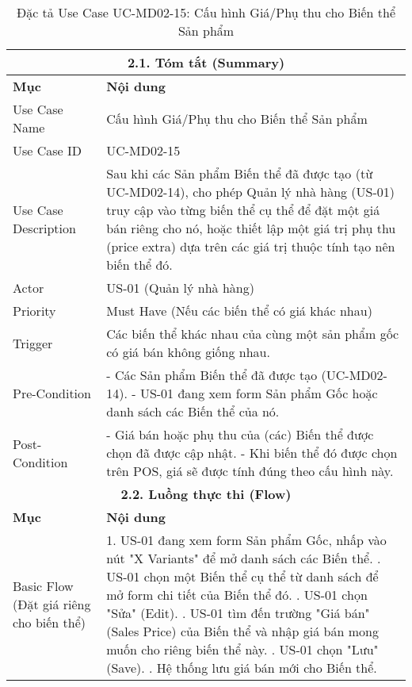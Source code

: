 \begin{longtable}{|m{4cm}|p{11cm}|}
\caption{Đặc tả Use Case UC-MD02-15: Cấu hình Giá/Phụ thu cho Biến thể Sản phẩm} \label{tab:uc_md02_15_revised} \\
\hline
\multicolumn{2}{|c|}{\textbf{2.1. Tóm tắt (Summary)}} \\
\hline
\textbf{Mục} & \textbf{Nội dung} \\
\hline
\endhead %
\hline
\endfoot %
\hline
\endlastfoot %
Use Case Name & Cấu hình Giá/Phụ thu cho Biến thể Sản phẩm \\
\hline
Use Case ID & UC-MD02-15 \\
\hline
Use Case Description & Sau khi các Sản phẩm Biến thể đã được tạo (từ UC-MD02-14), cho phép Quản lý nhà hàng (US-01) truy cập vào từng biến thể cụ thể để đặt một giá bán riêng cho nó, hoặc thiết lập một giá trị phụ thu (price extra) dựa trên các giá trị thuộc tính tạo nên biến thể đó. \\
\hline
Actor & US-01 (Quản lý nhà hàng) \\
\hline
Priority & Must Have (Nếu các biến thể có giá khác nhau) \\
\hline
Trigger & Các biến thể khác nhau của cùng một sản phẩm gốc có giá bán không giống nhau. \\
\hline
Pre-Condition & - Các Sản phẩm Biến thể đã được tạo (UC-MD02-14). \newline - US-01 đang xem form Sản phẩm Gốc hoặc danh sách các Biến thể của nó. \\
\hline
Post-Condition & - Giá bán hoặc phụ thu của (các) Biến thể được chọn đã được cập nhật. \newline - Khi biến thể đó được chọn trên POS, giá sẽ được tính đúng theo cấu hình này. \\
\hline
\multicolumn{2}{|c|}{\textbf{2.2. Luồng thực thi (Flow)}} \\
\hline
\textbf{Mục} & \textbf{Nội dung} \\
\hline
Basic Flow (Đặt giá riêng cho biến thể) & 1. US-01 đang xem form Sản phẩm Gốc, nhấp vào nút "X Variants" để mở danh sách các Biến thể. \newline 2. US-01 chọn một Biến thể cụ thể từ danh sách để mở form chi tiết của Biến thể đó. \newline 3. US-01 chọn "Sửa" (Edit). \newline 4. US-01 tìm đến trường "Giá bán" (Sales Price) của Biến thể và nhập giá bán mong muốn cho riêng biến thể này. \newline 5. US-01 chọn "Lưu" (Save). \newline 6. Hệ thống lưu giá bán mới cho Biến thể. \\

\end{longtable}
